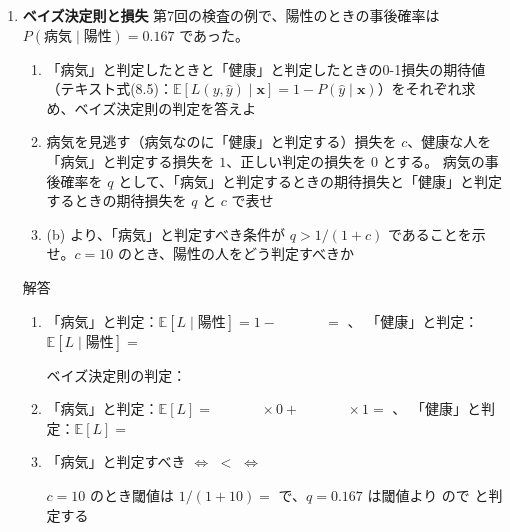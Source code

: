 \documentclass[a4paper,dvipdfmx]{jsarticle}
\newcommand{\提出期限}{2026年11月16日（月）}
\newcommand{\学籍番号}{0000000}
\newcommand{\氏名}{氏名を書く}
\newcommand{\提出日}{2026年11月16日}
\newenvironment{answer}{\begin{itembox}[l]{解答}}{\end{itembox}}
\begin{document}
\begin{enumerate}

  \item \textbf{ベイズ決定則と損失}\quad
    第7回の検査の例で、陽性のときの事後確率は $P(\text{病気} \mid \text{陽性}) = 0.167$ であった。
    \begin{enumerate}
      \item 「病気」と判定したときと「健康」と判定したときの0-1損失の期待値（テキスト式(8.5)：$\mathbb{E}[L(y, \hat{y}) \mid \bm{x}] = 1 - P(\hat{y} \mid \bm{x})$）をそれぞれ求め、ベイズ決定則の判定を答えよ
      \item 病気を見逃す（病気なのに「健康」と判定する）損失を $c$、健康な人を「病気」と判定する損失を $1$、正しい判定の損失を $0$ とする。
        病気の事後確率を $q$ として、「病気」と判定するときの期待損失と「健康」と判定するときの期待損失を $q$ と $c$ で表せ
      \item (b) より、「病気」と判定すべき条件が $q > 1/(1 + c)$ であることを示せ。$c = 10$ のとき、陽性の人をどう判定すべきか
    \end{enumerate}
    \begin{answer}
      \begin{enumerate}
        \item 「病気」と判定：$\mathbb{E}[L \mid \text{陽性}] = 1 - \phantom{XXXX} = $ \phantom{XXXX}、\quad
          「健康」と判定：$\mathbb{E}[L \mid \text{陽性}] = $ \phantom{XXXXXXXX}
          \vspace{2mm}

          ベイズ決定則の判定：\phantom{XXXXXX}
          \vspace{4mm}
        \item 「病気」と判定：$\mathbb{E}[L] = \phantom{XXXX} \times 0 + \phantom{XXXX} \times 1 = $ \phantom{XXXXXX}、\quad
          「健康」と判定：$\mathbb{E}[L] = $ \phantom{XXXXXXXXXXXX}
          \vspace{4mm}
        \item 「病気」と判定すべき $\iff$ \phantom{XXXXXXXX} $<$ \phantom{XXXXXXXX} $\iff$
          \vspace{10mm}

          $c = 10$ のとき閾値は $1/(1 + 10) = $ \phantom{XXXX} で、$q = 0.167$ は閾値より \phantom{XXXX} ので \phantom{XXXX} と判定する
          \vspace{2mm}
      \end{enumerate}
    \end{answer}


\end{enumerate}
\end{document}
